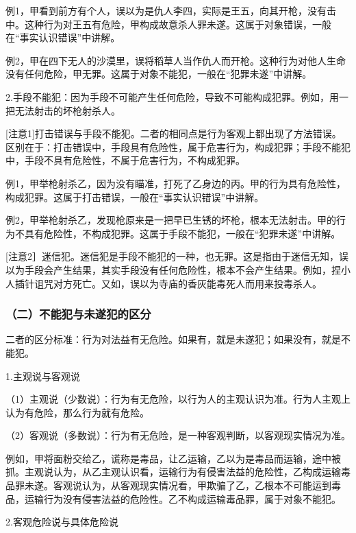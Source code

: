 例1，甲看到前方有个人，误以为是仇人李四，实际是王五，向其开枪，没有击中。这种行为对王五有危险，甲构成故意杀人罪未遂。这属于对象错误，一般在“事实认识错误”中讲解。

例2，甲在四下无人的沙漠里，误将稻草人当作仇人而开枪。这种行为对他人生命没有任何危险，甲无罪。这属于对象不能犯，一般在“犯罪未遂”中讲解。

2.手段不能犯：因为手段不可能产生任何危险，导致不可能构成犯罪。例如，用一把无法射击的坏枪射杀人。

[注意1]打击错误与手段不能犯。二者的相同点是行为客观上都出现了方法错误。区别在于：打击错误中，手段具有危险性，属于危害行为，构成犯罪；手段不能犯中，手段不具有危险性，不属于危害行为，不构成犯罪。

例1，甲举枪射杀乙，因为没有瞄准，打死了乙身边的丙。甲的行为具有危险性，构成犯罪。这属于打击错误，一般在“事实认识错误”中讲解。

例2，甲举枪射杀乙，发现枪原来是一把早已生锈的坏枪，根本无法射击。甲的行为不具有危险性，不构成犯罪。这属于手段不能犯，一般在“犯罪未遂”中讲解。

[注意2］迷信犯。迷信犯是手段不能犯的一种，也无罪。这是指由于迷信无知，误以为手段会产生结果，其实手段没有任何危险性，根本不会产生结果。例如，捏小人插针诅咒对方死亡。又如，误以为寺庙的香灰能毒死人而用来投毒杀人。

\subsubsection*{（二）不能犯与未遂犯的区分}


二者的区分标准：行为对法益有无危险。如果有，就是未遂犯；如果没有，就是不能犯。


1.主观说与客观说

（1）主观说（少数说）：行为有无危险，以行为人的主观认识为准。行为人主观上认为有危险，那么行为就有危险。

（2）客观说（多数说）：行为有无危险，是一种客观判断，以客观现实情况为准。

例如，甲将面粉交给乙，谎称是毒品，让乙运输，乙以为是毒品而运输，途中被抓。主观说认为，从乙主观认识看，运输行为有侵害法益的危险性，乙构成运输毒品罪未遂。客观说认为，从客观现实情况看，甲欺骗了乙，乙根本不可能运到毒品，运输行为没有侵害法益的危险性。乙不构成运输毒品罪，属于对象不能犯。

2.客观危险说与具体危险说

